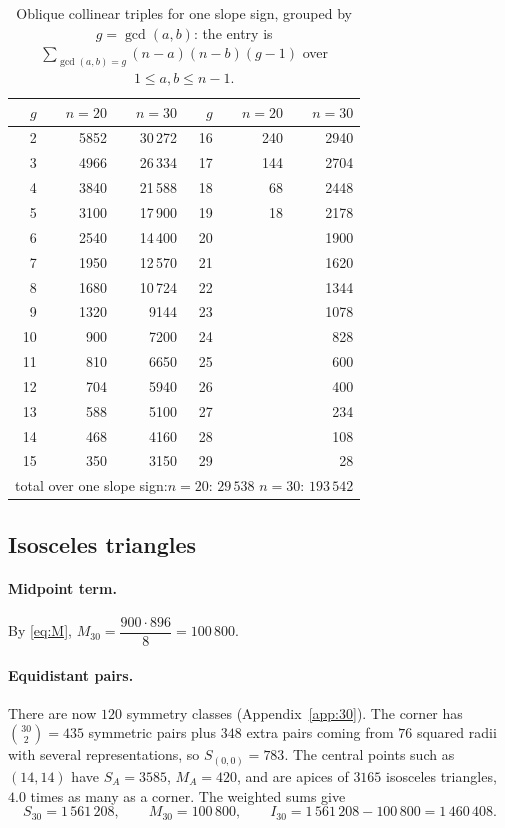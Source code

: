 \documentclass[11pt,a4paper]{article}
\theoremstyle{remark}
\begin{document}
\begin{table}[ht]
\centering
\small
\begin{tabular}{rrr@{\qquad}rrr}
\toprule
$g$ & $n=20$ & $n=30$ & $g$ & $n=20$ & $n=30$\\
\midrule
 2 & 5852 & 30\,272 & 16 & 240 & 2940 \\
 3 & 4966 & 26\,334 & 17 & 144 & 2704 \\
 4 & 3840 & 21\,588 & 18 &  68 & 2448 \\
 5 & 3100 & 17\,900 & 19 &  18 & 2178 \\
 6 & 2540 & 14\,400 & 20 &     & 1900 \\
 7 & 1950 & 12\,570 & 21 &     & 1620 \\
 8 & 1680 & 10\,724 & 22 &     & 1344 \\
 9 & 1320 &  9144 & 23 &     & 1078 \\
10 &  900 &  7200 & 24 &     &  828 \\
11 &  810 &  6650 & 25 &     &  600 \\
12 &  704 &  5940 & 26 &     &  400 \\
13 &  588 &  5100 & 27 &     &  234 \\
14 &  468 &  4160 & 28 &     &  108 \\
15 &  350 &  3150 & 29 &     &   28 \\
\midrule
\multicolumn{6}{r}{total over one slope sign:\quad $n=20$: $29\,538$\qquad
$n=30$: $193\,542$}\\
\bottomrule
\end{tabular}
\caption{Oblique collinear triples for one slope sign, grouped by
$g=\gcd(a,b)$: the entry is $\sum_{\gcd(a,b)=g}(n-a)(n-b)(g-1)$ over
$1\le a,b\le n-1$.}
\label{tab:oblique}
\end{table}

\subsection{Isosceles triangles}

\paragraph{Midpoint term.} By \eqref{eq:M},
$M_{30}=\dfrac{900\cdot896}{8}=100\,800$.

\paragraph{Equidistant pairs.} There are now $120$ symmetry classes
(Appendix~\ref{app:30}). The corner has $\binom{30}{2}=435$ symmetric pairs plus
$348$ extra pairs coming from $76$ squared radii with several representations,
so $S_{(0,0)}=783$. The central points such as $(14,14)$ have $S_A=3585$,
$M_A=420$, and are apices of $3165$ isosceles triangles, $4.0$ times as many as a
corner. The weighted sums give
\[
  S_{30}=1\,561\,208,\qquad M_{30}=100\,800,\qquad
  I_{30}=1\,561\,208-100\,800=1\,460\,408 .
\]
\end{document}
